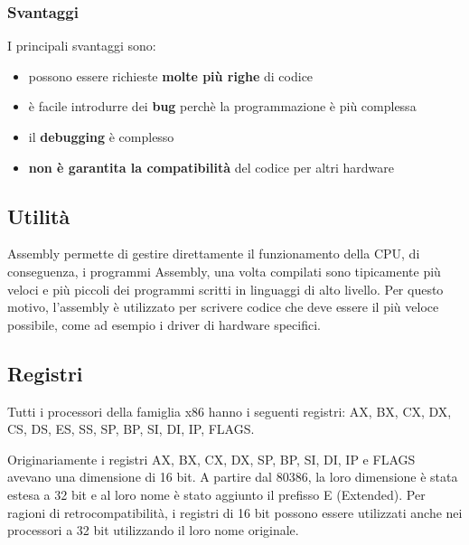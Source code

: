 \documentclass[a4paper]{article}
\theoremstyle{break}
\theoremstyle{break}
\theoremstyle{break}
\theoremstyle{break}
\begin{document}
\subsubsection{Svantaggi}
I principali svantaggi sono:
\begin{itemize}
	\item possono essere richieste \textbf{molte più righe} di codice
	\item è facile introdurre dei \textbf{bug} perchè la programmazione è più complessa
	\item il \textbf{debugging} è complesso
	\item \textbf{non è garantita la compatibilità} del codice per altri hardware
\end{itemize}

\subsection{Utilità}
Assembly permette di gestire direttamente il funzionamento della CPU, di conseguenza,
i programmi Assembly, una volta compilati sono tipicamente più veloci e più piccoli dei
programmi scritti in linguaggi di alto livello. Per questo motivo, l'assembly è utilizzato
per scrivere codice che deve essere il più veloce possibile, come ad esempio i driver di
hardware specifici.

\subsection{Registri}
Tutti i processori della famiglia x86 hanno i seguenti registri:
AX, BX, CX, DX, CS, DS, ES, SS, SP, BP, SI, DI, IP, FLAGS.

\vspace{1em}
\noindent Originariamente i registri AX, BX, CX, DX, SP, BP, SI, DI, IP e FLAGS avevano una dimensione
di 16 bit. A partire dal 80386, la loro dimensione è stata estesa a 32 bit e al loro nome
è stato aggiunto il prefisso E (Extended). Per ragioni di retrocompatibilità, i registri
di 16 bit possono essere utilizzati anche nei processori a 32 bit utilizzando il loro
nome originale.
\end{document}
